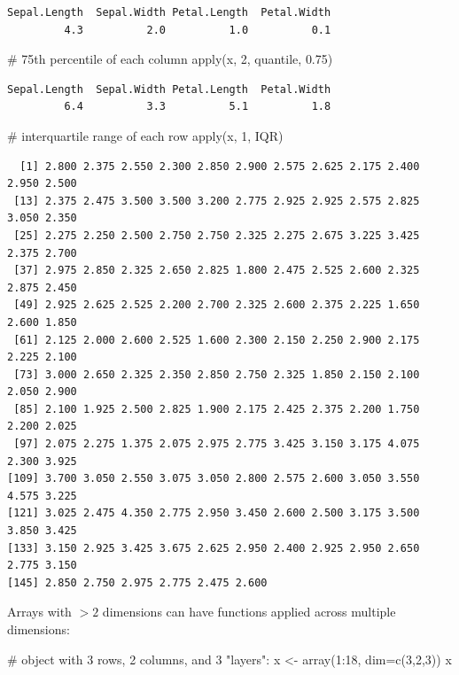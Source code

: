 \documentclass[
  13,
  letterpaper,
]{report}
\newenvironment{Shaded}{\begin{snugshade}}{\end{snugshade}}
\newcommand{\AttributeTok}[1]{\textcolor[rgb]{0.40,0.45,0.13}{#1}}
\newcommand{\CommentTok}[1]{\textcolor[rgb]{0.37,0.37,0.37}{#1}}
\newcommand{\DecValTok}[1]{\textcolor[rgb]{0.68,0.00,0.00}{#1}}
\newcommand{\FloatTok}[1]{\textcolor[rgb]{0.68,0.00,0.00}{#1}}
\newcommand{\FunctionTok}[1]{\textcolor[rgb]{0.28,0.35,0.67}{#1}}
\newcommand{\NormalTok}[1]{\textcolor[rgb]{0.00,0.23,0.31}{#1}}
\newcommand{\OtherTok}[1]{\textcolor[rgb]{0.00,0.23,0.31}{#1}}
\newcommand{\SpecialCharTok}[1]{\textcolor[rgb]{0.37,0.37,0.37}{#1}}
\begin{document}
\begin{verbatim}
Sepal.Length  Sepal.Width Petal.Length  Petal.Width 
         4.3          2.0          1.0          0.1 
\end{verbatim}

\begin{Shaded}
\begin{Highlighting}[]
\CommentTok{\# 75th percentile of each column}
\FunctionTok{apply}\NormalTok{(x, }\DecValTok{2}\NormalTok{, quantile, }\FloatTok{0.75}\NormalTok{)}
\end{Highlighting}
\end{Shaded}

\begin{verbatim}
Sepal.Length  Sepal.Width Petal.Length  Petal.Width 
         6.4          3.3          5.1          1.8 
\end{verbatim}

\begin{Shaded}
\begin{Highlighting}[]
\CommentTok{\# interquartile range of each row}
\FunctionTok{apply}\NormalTok{(x, }\DecValTok{1}\NormalTok{, IQR)}
\end{Highlighting}
\end{Shaded}

\begin{verbatim}
  [1] 2.800 2.375 2.550 2.300 2.850 2.900 2.575 2.625 2.175 2.400 2.950 2.500
 [13] 2.375 2.475 3.500 3.500 3.200 2.775 2.925 2.925 2.575 2.825 3.050 2.350
 [25] 2.275 2.250 2.500 2.750 2.750 2.325 2.275 2.675 3.225 3.425 2.375 2.700
 [37] 2.975 2.850 2.325 2.650 2.825 1.800 2.475 2.525 2.600 2.325 2.875 2.450
 [49] 2.925 2.625 2.525 2.200 2.700 2.325 2.600 2.375 2.225 1.650 2.600 1.850
 [61] 2.125 2.000 2.600 2.525 1.600 2.300 2.150 2.250 2.900 2.175 2.225 2.100
 [73] 3.000 2.650 2.325 2.350 2.850 2.750 2.325 1.850 2.150 2.100 2.050 2.900
 [85] 2.100 1.925 2.500 2.825 1.900 2.175 2.425 2.375 2.200 1.750 2.200 2.025
 [97] 2.075 2.275 1.375 2.075 2.975 2.775 3.425 3.150 3.175 4.075 2.300 3.925
[109] 3.700 3.050 2.550 3.075 3.050 2.800 2.575 2.600 3.050 3.550 4.575 3.225
[121] 3.025 2.475 4.350 2.775 2.950 3.450 2.600 2.500 3.175 3.500 3.850 3.425
[133] 3.150 2.925 3.425 3.675 2.625 2.950 2.400 2.925 2.950 2.650 2.775 3.150
[145] 2.850 2.750 2.975 2.775 2.475 2.600
\end{verbatim}

Arrays with \(>2\) dimensions can have functions applied across multiple
dimensions:

\begin{Shaded}
\begin{Highlighting}[]
\CommentTok{\# object with 3 rows, 2 columns, and 3 "layers":}
\NormalTok{x }\OtherTok{\textless{}{-}} \FunctionTok{array}\NormalTok{(}\DecValTok{1}\SpecialCharTok{:}\DecValTok{18}\NormalTok{, }\AttributeTok{dim=}\FunctionTok{c}\NormalTok{(}\DecValTok{3}\NormalTok{,}\DecValTok{2}\NormalTok{,}\DecValTok{3}\NormalTok{))}
\NormalTok{x}
\end{Highlighting}
\end{Shaded}
\end{document}
